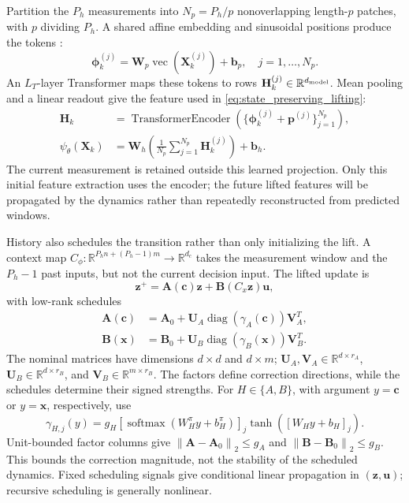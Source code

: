 \documentclass[journal]{IEEEtran}
\newcommand{\vphi}{\boldsymbol{\phi}}
\newcommand{\vp}{\mathbf{p}}
\newcommand{\vb}{\mathbf{b}}
\newcommand{\vx}{\mathbf{x}}
\newcommand{\vu}{\mathbf{u}}
\newcommand{\vz}{\mathbf{z}}
\newcommand{\vc}{\mathbf{c}}
\newcommand{\mH}{\mathbf{H}}
\newcommand{\mA}{\mathbf{A}}
\newcommand{\mB}{\mathbf{B}}
\newcommand{\mU}{\mathbf{U}}
\newcommand{\mV}{\mathbf{V}}
\newcommand{\mW}{\mathbf{W}}
\newcommand{\mX}{\mathbf{X}}
\newcommand{\R}{\mathbb{R}}
\newcommand{\norm}[1]{\left\lVert #1\right\rVert}
\begin{document}
Partition the $P_h$ measurements into $N_p=P_h/p$ nonoverlapping length-$p$ patches, with $p$ dividing $P_h$. A shared affine embedding and sinusoidal positions produce the tokens \cite{vaswani2017attention}:
\begin{equation}
\vphi_k^{(j)}=\mW_p\operatorname{vec}(\mX_k^{(j)})+\vb_p,
\quad j=1,\ldots,N_p.
\label{eq:patch_embedding}
\end{equation}
An $L_T$-layer Transformer maps these tokens to rows $\mH_k^{(j)}\in\R^{d_{\rm model}}$. Mean pooling and a linear readout give the feature used in \eqref{eq:state_preserving_lifting}:
\begin{align}
\mH_k&=\operatorname{TransformerEncoder}
  (\{\vphi_k^{(j)}+\vp^{(j)}\}_{j=1}^{N_p}),\label{eq:transformer_enc}\\
\psi_\theta(\mX_k)&=\mW_h\left(\frac1{N_p}\sum_{j=1}^{N_p}\mH_k^{(j)}\right)+\vb_h.
\label{eq:history_feature}
\end{align}
The current measurement is retained outside this learned projection. Only this initial feature extraction uses the encoder; the future lifted features will be propagated by the dynamics rather than repeatedly reconstructed from predicted windows.

History also schedules the transition rather than only initializing the lift. A context map $C_\phi:\R^{P_hn+(P_h-1)m}\to\R^{d_c}$ takes the measurement window and the $P_h-1$ past inputs, but not the current decision input. The lifted update is
\begin{equation}
\vz^+=\mA(\vc)\vz+\mB(C_x\vz)\vu,
\label{eq:scheduled_predictor}
\end{equation}
with low-rank schedules
\begin{align}
\mA(\vc)&=\mA_0+\mU_A\operatorname{diag}(\gamma_A(\vc))\mV_A^T,
\label{eq:transition_schedule}\\
\mB(\vx)&=\mB_0+\mU_B\operatorname{diag}(\gamma_B(\vx))\mV_B^T.
\label{eq:low_rank_schedules}
\end{align}
The nominal matrices have dimensions $d\times d$ and $d\times m$; $\mU_A,\mV_A\in\R^{d\times r_A}$, $\mU_B\in\R^{d\times r_B}$, and $\mV_B\in\R^{m\times r_B}$. The factors define correction directions, while the schedules determine their signed strengths. For $H\in\{A,B\}$, with argument $y=\vc$ or $y=\vx$, respectively, use
\begin{equation}
\gamma_{H,j}(y)=g_H[\operatorname{softmax}(W_H^\pi y+b_H^\pi)]_j
\tanh([W_Hy+b_H]_j).
\label{eq:A_modulation_coefficients}
\end{equation}
Unit-bounded factor columns give $\norm{\mA-\mA_0}_2\le g_A$ and $\norm{\mB-\mB_0}_2\le g_B$. This bounds the correction magnitude, not the stability of the scheduled dynamics. Fixed scheduling signals give conditional linear propagation in $(\vz,\vu)$; recursive scheduling is generally nonlinear.
\end{document}
